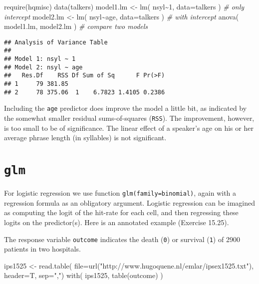 \documentclass[
]{book}
\newenvironment{Shaded}{\begin{snugshade}}{\end{snugshade}}
\newcommand{\AttributeTok}[1]{\textcolor[rgb]{0.77,0.63,0.00}{#1}}
\newcommand{\CommentTok}[1]{\textcolor[rgb]{0.56,0.35,0.01}{\textit{#1}}}
\newcommand{\DecValTok}[1]{\textcolor[rgb]{0.00,0.00,0.81}{#1}}
\newcommand{\FunctionTok}[1]{\textcolor[rgb]{0.00,0.00,0.00}{#1}}
\newcommand{\NormalTok}[1]{#1}
\newcommand{\OtherTok}[1]{\textcolor[rgb]{0.56,0.35,0.01}{#1}}
\newcommand{\SpecialCharTok}[1]{\textcolor[rgb]{0.00,0.00,0.00}{#1}}
\newcommand{\StringTok}[1]{\textcolor[rgb]{0.31,0.60,0.02}{#1}}
\begin{document}
\begin{Shaded}
\begin{Highlighting}[]
\FunctionTok{require}\NormalTok{(hqmisc)}
\FunctionTok{data}\NormalTok{(talkers)}
\NormalTok{model1.lm }\OtherTok{\textless{}{-}} \FunctionTok{lm}\NormalTok{( nsyl}\SpecialCharTok{\textasciitilde{}}\DecValTok{1}\NormalTok{, }\AttributeTok{data=}\NormalTok{talkers ) }\CommentTok{\# only intercept}
\NormalTok{model2.lm }\OtherTok{\textless{}{-}} \FunctionTok{lm}\NormalTok{( nsyl}\SpecialCharTok{\textasciitilde{}}\NormalTok{age, }\AttributeTok{data=}\NormalTok{talkers ) }\CommentTok{\# with intercept}
\FunctionTok{anova}\NormalTok{( model1.lm, model2.lm ) }\CommentTok{\# compare two models}
\end{Highlighting}
\end{Shaded}

\begin{verbatim}
## Analysis of Variance Table
## 
## Model 1: nsyl ~ 1
## Model 2: nsyl ~ age
##   Res.Df    RSS Df Sum of Sq      F Pr(>F)
## 1     79 381.85                           
## 2     78 375.06  1    6.7823 1.4105 0.2386
\end{verbatim}

Including the \texttt{age} predictor does improve the model a little bit,
as indicated by the somewhat smaller residual sums-of-squares
(\texttt{RSS}). The improvement, however, is too small to be of
significance. The linear effect of a speaker's age on his or her
average phrase length (in syllables) is not significant.

\hypertarget{glm}{%
\section{\texorpdfstring{\texttt{glm}}{glm}}\label{glm}}

For logistic regression we use function
\texttt{glm(family=binomial)}, again with a
regression formula as an obligatory argument. Logistic regression
can be imagined as computing the logit of the hit-rate for each
cell, and then regressing these logits on the predictor(s). Here is
an annotated example \citep{MMC03} (Exercise 15.25).

The response variable \texttt{outcome} indicates
the death (\texttt{0}) or survival
(\texttt{1}) of 2900 patients in two hospitals.

\begin{Shaded}
\begin{Highlighting}[]
\NormalTok{ips1525 }\OtherTok{\textless{}{-}} \FunctionTok{read.table}\NormalTok{( }
  \AttributeTok{file=}\FunctionTok{url}\NormalTok{(}\StringTok{"http://www.hugoquene.nl/emlar/ipsex1525.txt"}\NormalTok{),}
  \AttributeTok{header=}\NormalTok{T, }\AttributeTok{sep=}\StringTok{","}\NormalTok{) }
\FunctionTok{with}\NormalTok{( ips1525, }\FunctionTok{table}\NormalTok{(outcome) ) }
\end{Highlighting}
\end{Shaded}
\end{document}
